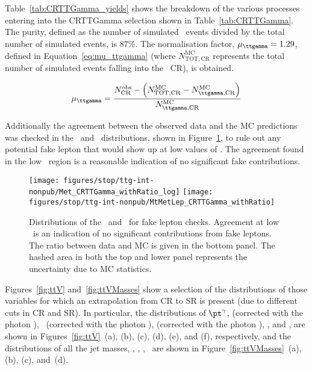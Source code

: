 		Table~\ref{tab:CRTTGamma_yields} shows the breakdown of the various processes entering into the CRTTGamma selection shown in Table~\ref{tab:CRTTGamma}. The purity, defined as the number of simulated \ttgamma\ events divided by the total number of simulated events, is $87\%$. The normalisation factor, $\mu_{\ttgamma} = 1.29$, defined in Equation~\ref{eq:mu_ttgamma} (where $N_{\mathrm{TOT,CR}}^{\mathrm{MC}}$ represents the total number of simulated events falling into the \ttgamma\ \ac{CR}), is obtained. 

		\begin{equation}
			\mu_{\ttgamma} = \frac{ N_{\mathrm{CR}}^{\mathrm{obs}} - \left ( N_{\mathrm{TOT,CR}}^{\mathrm{MC}} - N_{\ttgamma, \mathrm{CR}}^{\mathrm{MC}} \right ) } { N_{\ttgamma,\mathrm{CR}}^{\mathrm{MC}} }
			\label{eq:mu_ttgamma}
		\end{equation}

		Additionally the agreement between the observed data and the \ac{MC} predictions was checked in the \met\ and \mtlepmet\ distributions, shown in Figure~\ref{fig:fakes_check}, to rule out any potential fake lepton that would show up at low values of \mtlepmet. The agreement found in the low \mtlepmet\ region is a reasonable indication of no significant fake contributions.

		\begin{figure}[htbp]
			\begin{center}
				\texttt{[image: figures/stop/ttg-int-nonpub/Met\_CRTTGamma\_withRatio\_log]}
				\texttt{[image: figures/stop/ttg-int-nonpub/MtMetLep\_CRTTGamma\_withRatio]}
				\caption{\label{fig:ttVFakeLepCheck} Distributions of the \met\ and \mtlepmet\ for fake lepton checks. Agreement at low \mtlepmet\ is an indication of no significant contributions from fake leptons. The ratio between data and \ac{MC} is given in the bottom panel. The hashed area in both the top and lower panel represents the uncertainty due to \ac{MC} statistics.}
				\label{fig:fakes_check}
			\end{center}
		\end{figure}

		Figures~\ref{fig:ttV} and~\ref{fig:ttVMasses} show a selection of the distributions of those variables for which an extrapolation from \ac{CR} to \ac{SR} is present (due to different cuts in \ac{CR} and \ac{SR}). In particular, the distributions of $\pt^{\gamma}$, \mttwo (corrected with the photon \pt), \mtbmin\ (corrected with the photon \pt), \mtbmax (corrected with the photon \pt), \HT, and \drbb, are shown in Figures~\ref{fig:ttV}~(a), (b), (c), (d), (e), and (f), respectively, and the distributions of all the jet masses, \mantikttwelvezero, \mantikttwelveone, \mantikteightzero, \mantikteightone\ are shown in Figure~\ref{fig:ttVMasses}~(a), (b), (c), and~(d).


